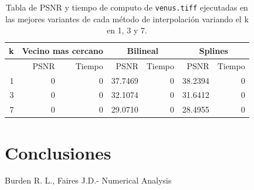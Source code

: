 \documentclass[a4paper]{article}
\newcounter{col}
\begin{document}
\begin{table}[H]
\centering
\begin{tabular}{|r|r|r|r|r|r|r|}
\hline
\multicolumn{1}{|c|}{k} & \multicolumn{2}{|c|}{Vecino mas cercano} & \multicolumn{2}{|c|}{Bilineal} & \multicolumn{2}{|c|}{Splines} \\ \hline
  & PSNR & Tiempo & PSNR & Tiempo & PSNR & Tiempo \\ \hline
1 & 0 & 0 & 37.7469 & 0 &  38.2394 & 0 \\ \hline
3 & 0 & 0 & 32.1074 & 0 &  31.6412 & 0 \\ \hline
7 & 0 & 0 &  29.0710 & 0 & 28.4955 & 0 \\ \hline
\end{tabular}
\caption{Tabla de PSNR y tiempo de computo de \texttt{venus.tiff} ejecutadas en las mejores variantes de cada m\'etodo de interpolaci\'on variando el k en 1, 3 y 7.}
\label{}
\end{table}




\section{Conclusiones}

\begin{thebibliography}{abbrvnat}
 Burden R. L., Faires J.D.- Numerical Analysis
\end{thebibliography}
\end{document}
